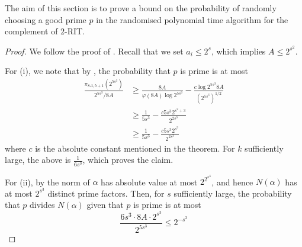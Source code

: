 The aim of this section is to prove a bound on the probability of randomly choosing a good prime $p$ in the randomised polynomial time algorithm for the complement of $2$-RIT.

\probabilityprimep*

\begin{proof}

We follow the proof of \cite[Proposition 9]{balaji2021cyclotomic}. Recall that we set  $a_i\leq 2^s$,
which implies $A \leq 2^{s^2}$.

For (i), we note that by , the probability that $p$ is prime is at most
\begin{align*}
	\frac{\pi_{8A,b+1}(2^{5s^3})}{{2^{5s^3}}/{8A}}
	&\geq \frac{8A}{\varphi(8A)\log 2^{5s^3} } - \frac{c \log 2^{5s^3} 8A}{(2^{5s^3})^{1/2}} \\
	&\geq \frac{1}{5s^3} - \frac{c {5s^3} 2^{s^2 + 3}}{2^{2s^3}} \\
	&\geq \frac{1}{5s^3} - \frac{c {5s^3} 2^{s^3}}{2^{2s^3}}
\end{align*}
where $c$ is the absolute constant mentioned in the theorem. For $k$ sufficiently large, the above is
$\frac{1}{6s^3}$, which proves the claim.
	
For (ii), by  the norm of $\alpha$ has absolute value at most
$2^{2^{s^3}}$, and hence $N(\alpha)$ has at most $2^{s^3}$ 
distinct prime factors. Then, for $s$ sufficiently large, the probability that $p$ divides $N(\alpha)$ given that $p$ is prime is at most
\[ \frac{6s^3 \cdot 8A \cdot 2^{s^3}}{2^{5s^3}} \leq 2^{-s^{3}}\]	
\end{proof}

